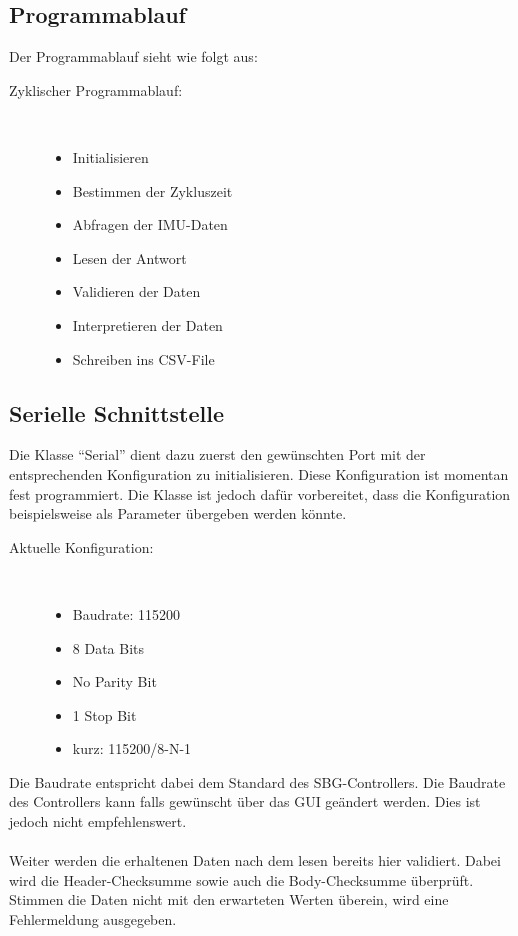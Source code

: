 \documentclass[12pt]{article} %
\begin{document}
	\subsection{Programmablauf}
	Der Programmablauf sieht wie folgt aus:
	
	\begin{description}
		\item[Zyklischer Programmablauf:]~\par
		\begin{itemize}
			\item Initialisieren
			\item Bestimmen der Zykluszeit
			\item Abfragen der IMU-Daten
			\item Lesen der Antwort
			\item Validieren der Daten
			\item Interpretieren der Daten
			\item Schreiben ins CSV-File	
		\end{itemize}
	\end{description}
	
	\subsection{Serielle Schnittstelle}
	Die Klasse "`Serial"' dient dazu zuerst den gewünschten Port mit der entsprechenden Konfiguration zu initialisieren. Diese Konfiguration ist momentan fest programmiert. Die Klasse ist jedoch dafür vorbereitet, dass die Konfiguration beispielsweise als Parameter übergeben werden könnte.
	
		\begin{description}
			\item[Aktuelle Konfiguration:]~\par
			\begin{itemize}
				\item Baudrate: 115200
				\item 8 Data Bits
				\item No Parity Bit
				\item 1 Stop Bit
				\item kurz: 115200/8-N-1	
			\end{itemize}
		\end{description}
	\noindent
	Die Baudrate entspricht dabei dem Standard des SBG-Controllers. Die Baudrate des Controllers kann falls gewünscht über das GUI geändert werden. Dies ist jedoch nicht empfehlenswert.\\
	\\
	Weiter werden die erhaltenen Daten nach dem lesen bereits hier validiert. Dabei wird die Header-Checksumme sowie auch die Body-Checksumme überprüft. Stimmen die Daten nicht mit den erwarteten Werten überein, wird eine Fehlermeldung ausgegeben.
	
\end{document}
